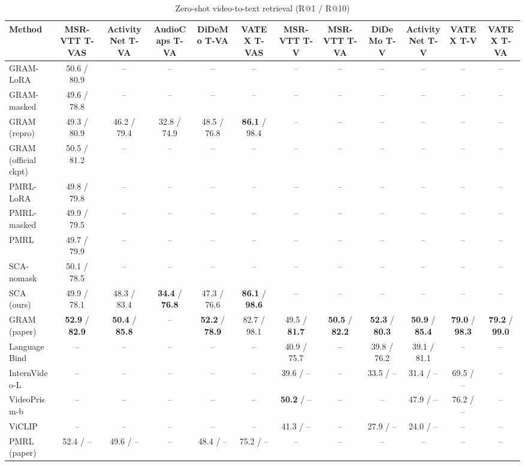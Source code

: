 \begin{table}[t]
\centering
\caption{Zero-shot video-to-text retrieval (R@1 / R@10)}
\label{tab:zeroshot_v2t}
\small
\begin{tabular}{lccccccccccc}
\toprule
Method & MSR-VTT T-VAS & ActivityNet T-VA & AudioCaps T-VA & DiDeMo T-VA & VATEX T-VAS & MSR-VTT T-V & MSR-VTT T-VA & DiDeMo T-V & ActivityNet T-V & VATEX T-V & VATEX T-VA \\
\midrule
GRAM-LoRA & 50.6 / 80.9 & -- & -- & -- & -- & -- & -- & -- & -- & -- & -- \\
GRAM-masked & 49.6 / 78.8 & -- & -- & -- & -- & -- & -- & -- & -- & -- & -- \\
GRAM (repro) & 49.3 / 80.9 & 46.2 / 79.4 & 32.8 / 74.9 & 48.5 / 76.8 & \textbf{86.1} / 98.4 & -- & -- & -- & -- & -- & -- \\
GRAM (official ckpt) & 50.5 / 81.2 & -- & -- & -- & -- & -- & -- & -- & -- & -- & -- \\
PMRL-LoRA & 49.8 / 79.8 & -- & -- & -- & -- & -- & -- & -- & -- & -- & -- \\
PMRL-masked & 49.9 / 79.5 & -- & -- & -- & -- & -- & -- & -- & -- & -- & -- \\
PMRL & 49.7 / 79.9 & -- & -- & -- & -- & -- & -- & -- & -- & -- & -- \\
SCA-nomask & 50.1 / 78.5 & -- & -- & -- & -- & -- & -- & -- & -- & -- & -- \\
SCA (ours) & 49.9 / 78.1 & 48.3 / 83.4 & \textbf{34.4} / \textbf{76.8} & 47.3 / 76.6 & \textbf{86.1} / \textbf{98.6} & -- & -- & -- & -- & -- & -- \\
GRAM (paper) & \textbf{52.9} / \textbf{82.9} & \textbf{50.4} / \textbf{85.8} & -- & \textbf{52.2} / \textbf{78.9} & 82.7 / 98.1 & 49.5 / \textbf{81.7} & \textbf{50.5} / \textbf{82.2} & \textbf{52.3} / \textbf{80.3} & \textbf{50.9} / \textbf{85.4} & \textbf{79.0} / \textbf{98.3} & \textbf{79.2} / \textbf{99.0} \\
LanguageBind & -- & -- & -- & -- & -- & 40.9 / 75.7 & -- & 39.8 / 76.2 & 39.1 / 81.1 & -- & -- \\
InternVideo-L & -- & -- & -- & -- & -- & 39.6 / -- & -- & 33.5 / -- & 31.4 / -- & 69.5 / -- & -- \\
VideoPrism-b & -- & -- & -- & -- & -- & \textbf{50.2} / -- & -- & -- & 47.9 / -- & 76.2 / -- & -- \\
ViCLIP & -- & -- & -- & -- & -- & 41.3 / -- & -- & 27.9 / -- & 24.0 / -- & -- & -- \\
PMRL (paper) & 52.4 / -- & 49.6 / -- & -- & 48.4 / -- & 75.2 / -- & -- & -- & -- & -- & -- & -- \\
\bottomrule
\end{tabular}
\end{table}
